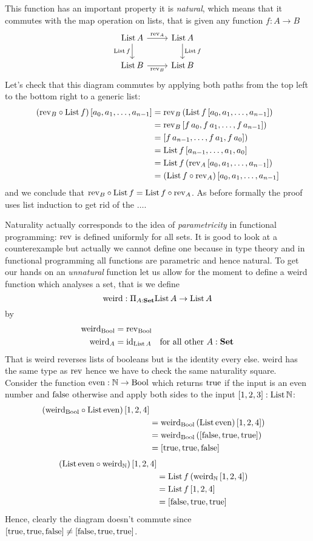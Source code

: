 This function has an important property it is \emph{natural}, which means that it commutes with the map operation on lists, that is given any function 
$f : A \to B$
\[\begin{tikzcd}
\List\,A \arrow[r,"\rev_A"] \arrow[d,"\List\,f" left] & \List\,A \arrow[d,"\List\,f"]\\
\List\,B \arrow[r,"\rev_B" below] & \List\,B
\end{tikzcd}
\]
Let's check that this diagram commutes by applying both paths from the top left to the bottom right to a generic list:
\begin{align*}
(\mathrm{rev}_B \circ \mathrm{List}\,f)\, [a_0,a_1,\dots,a_{n-1}] 
& = \mathrm{rev}_B\,(\mathrm{List}\,f\, [a_0,a_1,\dots,a_{n-1}]) \\
& = \mathrm{rev}_B\,[f\,a_0,f\,a_1,\dots,f\,a_{n-1}]) \\
& = [f\,a_{n-1}, \dots,f\,a_1,f\,a_0]) \\
& = \mathrm{List}\,f\, [a_{n-1},\dots,a_1,a_0]\\
& = \mathrm{List}\,f\,(\mathrm{rev}_A\, [a_0,a_1,\dots,a_{n-1}])\\
& = (\mathrm{List}\,f\circ \mathrm{rev}_A)\, [a_0,a_1,\dots,a_{n-1}]
\end{align*}
and we conclude that $\mathrm{rev}_B \circ \mathrm{List}\,f = \mathrm{List}\,f\circ \mathrm{rev}_A$. As before formally the proof uses list induction to get rid of the $\dots$.

Naturality actually corresponds to the idea of \emph{parametricity} in functional programming: $\mathrm{rev}$ is defined uniformly for all sets. It is good to look at a counterexample but actually we cannot define one because in type theory and in functional programming all functions are parametric and hence natural. To get our hands on an \emph{unnatural} function let us allow for the moment to define a weird function which analyses a set, that is we define
\[ \mathrm{weird} : \Pi_{A:\mathbf{Set}} \mathrm{List}\,A \to \mathrm{List}\,A\]
by 
\begin{align*}
  \mathrm{weird}_{\mathrm{Bool}} & = \mathrm{rev}_{\mathrm{Bool}} \\
  \mathrm{weird}_A & = \mathrm{id}_{\mathrm{List}\,A} \quad\mbox{for all other $A:\mathbf{Set}$}
\end{align*}
That is weird reverses lists of booleans but is the identity every else. weird has the same type as $\mathrm{rev}$ hence we have to check the same naturality square. Consider the function $\mathrm{even} : \mathbb{N} \to \mathrm{Bool}$ which returns $\mathrm{true}$ if the input is an even number and $\mathrm{false}$ otherwise and apply both sides to the input $[1,2,3]:\mathrm{List}\,\mathbb{N}$:
\begin{align*}
(\mathrm{weird}_{\mathrm{Bool}} \circ \mathrm{List}\,\mathrm{even})\,[1,2,4] \\
& = \mathrm{weird}_{\mathrm{Bool}}\,(\mathrm{List}\,\mathrm{even})\,[1,2,4])  \\
& = \mathrm{weird}_{\mathrm{Bool}}\,([\mathrm{false},\mathrm{true},\mathrm{true}])  \\
& = [\mathrm{true},\mathrm{true},\mathrm{false}]
\end{align*}
\begin{align*}
(\mathrm{List}\,\mathrm{even}\circ \mathrm{weird}_{\mathbb{N}})\, [1,2,4] \\
& = \mathrm{List}\,f\,(\mathrm{weird}_{\mathbb{N}}\, [1,2,4]) \\
& = \mathrm{List}\,f\,[1,2,4] \\
& = [\mathrm{false},\mathrm{true},\mathrm{true}]
\end{align*}
Hence, clearly the diagram doesn't commute since $[\mathrm{true},\mathrm{true},\mathrm{false}] \not= [\mathrm{false},\mathrm{true},\mathrm{true}]$.

